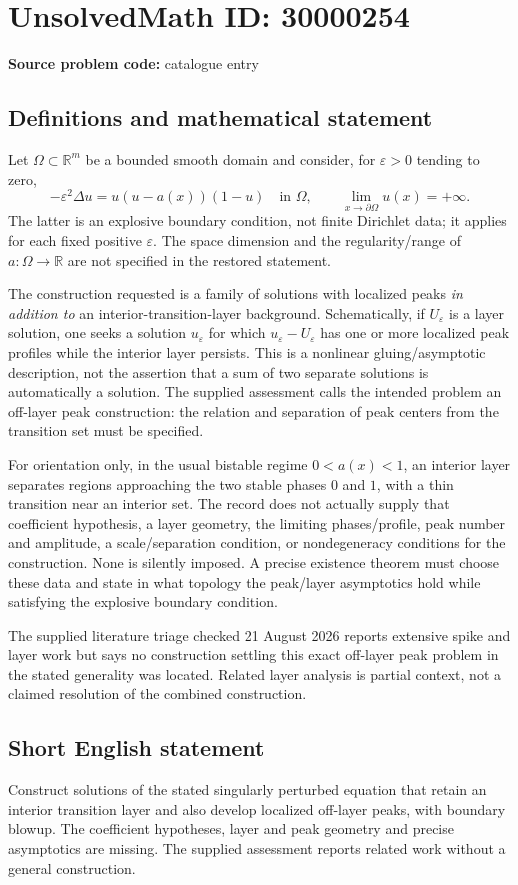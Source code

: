 \documentclass[11pt]{article}
\newcommand{\R}{\mathbb{R}}
\begin{document}
\section*{UnsolvedMath ID: 30000254}
\textbf{Source problem code:} catalogue entry
\subsection{Definitions and mathematical statement}
Let $\Omega\subset\R^m$ be a bounded smooth domain and consider, for $\varepsilon>0$ tending to zero,
\[
 -\varepsilon^2\Delta u=u(u-a(x))(1-u)\quad\text{in }\Omega,
 \qquad \lim_{x\to\partial\Omega}u(x)=+\infty.
\]
The latter is an explosive boundary condition, not finite Dirichlet data; it applies for each fixed positive $\varepsilon$. The space dimension and the regularity/range of $a:\Omega\to\R$ are not specified in the restored statement.

The construction requested is a family of solutions with localized peaks \emph{in addition to} an interior-transition-layer background. Schematically, if $U_\varepsilon$ is a layer solution, one seeks a solution $u_\varepsilon$ for which $u_\varepsilon-U_\varepsilon$ has one or more localized peak profiles while the interior layer persists. This is a nonlinear gluing/asymptotic description, not the assertion that a sum of two separate solutions is automatically a solution. The supplied assessment calls the intended problem an off-layer peak construction: the relation and separation of peak centers from the transition set must be specified.

For orientation only, in the usual bistable regime $0<a(x)<1$, an interior layer separates regions approaching the two stable phases $0$ and $1$, with a thin transition near an interior set. The record does not actually supply that coefficient hypothesis, a layer geometry, the limiting phases/profile, peak number and amplitude, a scale/separation condition, or nondegeneracy conditions for the construction. None is silently imposed. A precise existence theorem must choose these data and state in what topology the peak/layer asymptotics hold while satisfying the explosive boundary condition.

The supplied literature triage checked 21 August 2026 reports extensive spike and layer work but says no construction settling this exact off-layer peak problem in the stated generality was located. Related layer analysis is partial context, not a claimed resolution of the combined construction.
\subsection{Short English statement}
Construct solutions of the stated singularly perturbed equation that retain an interior transition layer and also develop localized off-layer peaks, with boundary blowup. The coefficient hypotheses, layer and peak geometry and precise asymptotics are missing. The supplied assessment reports related work without a general construction.
\end{document}
